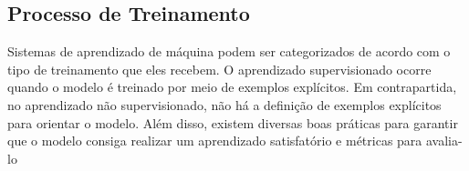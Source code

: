 
            

                
    \subsection{Processo de Treinamento}
        Sistemas de aprendizado de máquina podem ser categorizados de acordo com o tipo de treinamento que
        eles recebem. O aprendizado supervisionado ocorre quando o modelo é treinado por meio de exemplos explícitos. 
        Em contrapartida, no aprendizado não supervisionado, não há a definição de exemplos explícitos para orientar o 
        modelo. Além disso, existem diversas boas práticas para garantir que o modelo consiga realizar um aprendizado satisfatório 
        e métricas para avalia-lo
         
